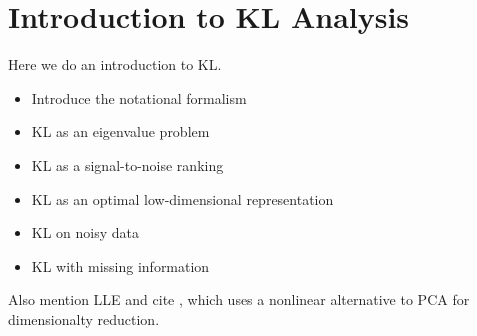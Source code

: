 \chapter{Introduction to KL Analysis}

Here we do an introduction to KL.

\begin{itemize}
  \item Introduce the notational formalism
  \item KL as an eigenvalue problem
  \item KL as a signal-to-noise ranking
  \item KL as an optimal low-dimensional representation
  \item KL on noisy data
  \item KL with missing information
\end{itemize}

Also mention LLE and cite \cite{Vanderplas2009}, which uses a nonlinear
alternative to PCA for dimensionalty reduction.